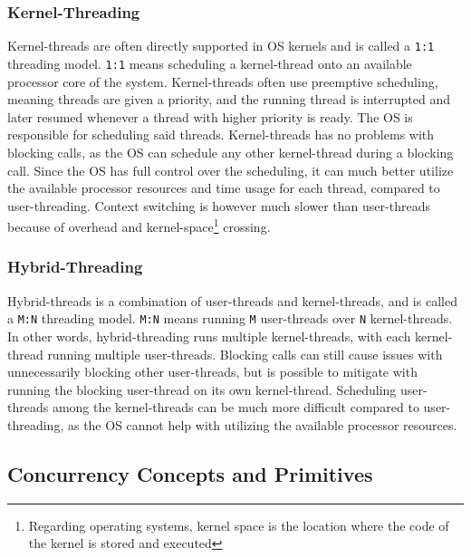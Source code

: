 \subsubsection{Kernel\hyp{}Threading}


Kernel\hyp{}threads are often directly supported in OS kernels and is called a \texttt{1:1} threading model. \texttt{1:1} means scheduling a kernel\hyp{}thread onto an available processor core of the system. Kernel\hyp{}threads often use preemptive scheduling, meaning threads are given a priority, and the running thread is interrupted and later resumed whenever a thread with higher priority is ready. The OS is responsible for scheduling said threads. Kernel\hyp{}threads has no problems with blocking calls, as the OS can schedule any other kernel\hyp{}thread during a blocking call. Since the OS has full control over the scheduling, it can much better utilize the available processor resources and time usage for each thread, compared to user\hyp{}threading. Context switching is however much slower than user\hyp{}threads because of overhead and kernel\hyp{}space\footnote{Regarding operating systems, kernel space is the location where the code of the kernel is stored and executed} crossing.


\subsubsection{Hybrid\hyp{}Threading}


Hybrid\hyp{}threads is a combination of user\hyp{}threads and kernel\hyp{}threads, and is called a \texttt{M:N} threading model. \texttt{M:N} means running \texttt{M} user\hyp{}threads over \texttt{N} kernel\hyp{}threads. In other words, hybrid\hyp{}threading runs multiple kernel\hyp{}threads, with each kernel\hyp{}thread running multiple user\hyp{}threads. Blocking calls can still cause issues with unnecessarily blocking other user\hyp{}threads, but is possible to mitigate with running the blocking user\hyp{}thread on its own kernel\hyp{}thread. Scheduling user\hyp{}threads among the kernel\hyp{}threads can be much more difficult compared to user\hyp{}threading, as the OS cannot help with utilizing the available processor resources. 


\subsection{Concurrency Concepts and Primitives}
\label{subsec:concepts_primitives}


